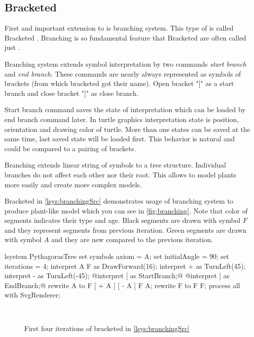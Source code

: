 \subsection{Bracketed \lsystems}

First and important extension to \dzerolsystem is branching system.
This type of \lsystem is called Bracketed \lsystem\cite{PL91}.
Branching is so fundamental feature that Bracketed \lsystems are often called just \lsystems.

Branching system extends symbol interpretation by two commands \emph{start branch} and \emph{end branch}.
These commands are nearly always represented as symbols of brackets (from which bracketed \lsystems got their name).
Open bracket "$[$" as a start branch and close bracket "$]$" as close branch.

Start branch command saves the state of interpretation which can be loaded by end branch command later.
In turtle graphics interpretation state is position, orientation and drawing color of turtle.
More than one states can be saved at the same time, last saved state will be loaded first.
This behavior is natural and could be compared to a pairing of brackets.

Branching extends linear string of symbols to a tree structure.
Individual branches do not affect each other nor their root.
This allows to model plants more easily and create more complex models.

Bracketed \lsystem in \autoref{lsys:branchingSrc} demonstrates usage of branching system to produce plant-like model which you can see in \autoref{fig:branching}.
Note that color of segments indicates their type and age.
Black segments are drawn with symbol $F$ and they represent segments from previous iteration.
Green segments are drawn with symbol $A$ and they are new compared to the previous iteration.

\begin{Lsystem}[label=lsys:branchingSrc,caption={Bracketed \lsystem which creates plant-like model (\autoref{fig:branching})}]
lsystem PythagorasTree {
	set symbols axiom = A;
	set initialAngle = 90;
	set iterations = 4;	
	interpret A F as DrawForward(16);
	interpret + as TurnLeft(45);
	interpret - as TurnLeft(-45);
	@interpret [ as StartBranch;@
	@interpret ] as EndBranch;@
	rewrite A to F [ + A ] [ - A ] F A;
	rewrite F to F F;
}
process all with SvgRenderer;
\end{Lsystem}

\begin{figure}[h]
	\centering
	 ~
	 ~
	 ~
	\caption{First four iterations of bracketed \lsystem in \autoref{lsys:branchingSrc}}
	\label{fig:branching}
\end{figure}



